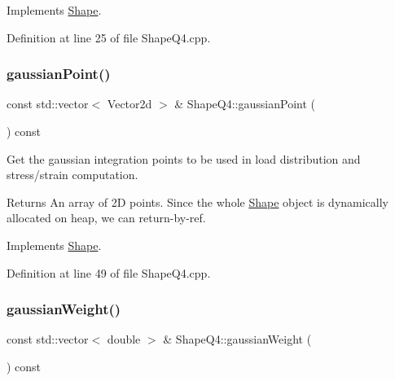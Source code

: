 Implements \mbox{\hyperlink{class_shape_ab6e0d64b40e09c176ce2ece24bc94a37}{Shape}}.



Definition at line 25 of file Shape\+Q4.\+cpp.

\mbox{\label{class_shape_q4_a5c185036352eabf489007b92f6d48ad2}} 
\subsubsection{\texorpdfstring{gaussian\+Point()}{gaussianPoint()}}
{\footnotesize\ttfamily const std\+::vector$<$ Vector2d $>$ \& Shape\+Q4\+::gaussian\+Point (\begin{DoxyParamCaption}{ }\end{DoxyParamCaption}) const\hspace{0.3cm}{\ttfamily [virtual]}}



Get the gaussian integration points to be used in load distribution and stress/strain computation. 

\begin{DoxyReturn}{Returns}
An array of 2D points. Since the whole \mbox{\hyperlink{class_shape}{Shape}} object is dynamically allocated on heap, we can return-\/by-\/ref. 
\end{DoxyReturn}


Implements \mbox{\hyperlink{class_shape_afa8029d0991fc5d9054a667823224bd0}{Shape}}.



Definition at line 49 of file Shape\+Q4.\+cpp.

\mbox{\label{class_shape_q4_a51233dd1caaabbe8404c06b5b0db5755}} 
\subsubsection{\texorpdfstring{gaussian\+Weight()}{gaussianWeight()}}
{\footnotesize\ttfamily const std\+::vector$<$ double $>$ \& Shape\+Q4\+::gaussian\+Weight (\begin{DoxyParamCaption}{ }\end{DoxyParamCaption}) const\hspace{0.3cm}{\ttfamily [virtual]}}



